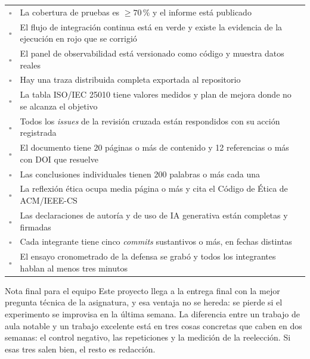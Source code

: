 \documentclass[11pt,a4paper]{article}
\begin{document}
\begin{center}
\begin{longtable}{@{}p{0.7cm}p{14.2cm}@{}}
			$\square$ & La cobertura de pruebas es $\geq 70\,\%$ y el informe está publicado \\
			$\square$ & El flujo de integración continua está en verde y existe la evidencia de la ejecución en rojo que se corrigió \\
			$\square$ & El panel de observabilidad está versionado como código y muestra datos reales \\
			$\square$ & Hay una traza distribuida completa exportada al repositorio \\
			$\square$ & La tabla ISO/IEC 25010 tiene valores medidos y plan de mejora donde no se alcanza el objetivo \\
			$\square$ & Todos los \emph{issues} de la revisión cruzada están respondidos con su acción registrada \\
			$\square$ & El documento tiene 20 páginas o más de contenido y 12 referencias o más con DOI que resuelve \\
			$\square$ & Las conclusiones individuales tienen 200 palabras o más cada una \\
			$\square$ & La reflexión ética ocupa media página o más y cita el Código de Ética de ACM/IEEE-CS \\
			$\square$ & Las declaraciones de autoría y de uso de IA generativa están completas y firmadas \\
			$\square$ & Cada integrante tiene cinco \emph{commits} sustantivos o más, en fechas distintas \\
			$\square$ & El ensayo cronometrado de la defensa se grabó y todos los integrantes hablan al menos tres minutos \\
			\bottomrule
		\end{longtable}
	\end{center}
	
	\vspace{6pt}
	\begin{uteqbox}{Nota final para el equipo}
		Este proyecto llega a la entrega final con la mejor pregunta técnica de la asignatura, y esa ventaja no se hereda: se pierde si el experimento se improvisa en la última semana. La diferencia entre un trabajo de aula notable y un trabajo excelente está en tres cosas concretas que caben en dos semanas: el control negativo, las repeticiones y la medición de la reelección. Si esas tres salen bien, el resto es redacción.
	\end{uteqbox}
	
\end{document}
